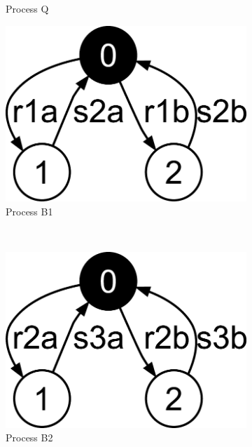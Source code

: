\begin{figure}[hbt]
\begin{subfigure}[b]{100pt}
    \caption{Process Q}
  \end{subfigure}
  \hfill
  \begin{subfigure}[b]{130pt}
    \centering
    \includegraphics[scale=0.2]{prop-pres-case-studies/figs/abp-B1}
    \caption{Process B1}
  \end{subfigure}
  \\
  \begin{subfigure}[b]{130pt}
    \centering
    \includegraphics[scale=0.2]{prop-pres-case-studies/figs/abp-B2}
    \caption{Process B2}
  \end{subfigure}
  \hfill
  \begin{subfigure}[b]{100pt}
    \centering

\end{subfigure}
\end{figure}
